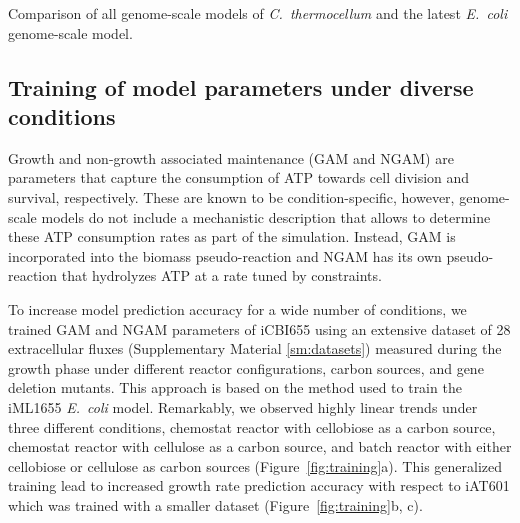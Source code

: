\begin{table}[h]
    \caption[Comparison of all genome-scale models of \textit{C.~thermocellum}]{Comparison of all genome-scale models of \textit{C.~thermocellum} and the latest \textit{E.~coli} genome-scale model.}
    \centering
    
    \label{tab:models}
\end{table}

\subsection{Training of model parameters under diverse conditions}

Growth and non-growth associated maintenance (GAM and NGAM) are parameters that capture the consumption of ATP towards cell division and survival, respectively. These are known to be condition-specific, however, genome-scale models do not include a mechanistic description that allows to determine these ATP consumption rates as part of the simulation. Instead, GAM is incorporated into the biomass pseudo-reaction and NGAM has its own pseudo-reaction that hydrolyzes ATP at a rate tuned by constraints.

To increase model prediction accuracy for a wide number of conditions, we trained GAM and NGAM parameters of iCBI655 using an extensive dataset of 28 extracellular fluxes (Supplementary Material \ref{sm:datasets}) measured during the
growth phase under different reactor configurations, carbon sources, and gene deletion mutants. This approach is based on the method used to train the iML1655 \textit{E.~coli} model. \citep{monk2017}
Remarkably, we observed highly linear trends under three different conditions, chemostat reactor with cellobiose as a carbon source, chemostat reactor with cellulose as a carbon source, and batch reactor with either cellobiose or cellulose as carbon sources (Figure~\ref{fig:training}a). This generalized training lead to increased growth rate prediction accuracy with respect to iAT601 which was trained with a smaller dataset (Figure~\ref{fig:training}b, c).

